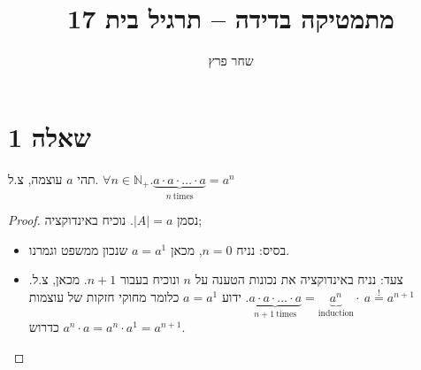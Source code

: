 \documentclass[]{article}
\title{מתמטיקה בדידה – תרגיל בית 17}
\author{שחר פרץ}
\newcommand\N     {\mathbb{N}}
\newcommand\seq   {\overset{!}{=}}
\begin{document}
	\maketitle
	\section*{שאלה 1}
	תהי $ a $ עוצמה, צ.ל.
	$ \forall n \in \N_+. \underbrace{a \cdot a \cdot \dotsc \cdot a}_{n \ \mathrm{times}} = a^n $
	\begin{proof}
		נסמן $ |A| = a $. נוכיח באינדוקציה;
		\begin{itemize}
			\item בסיס: נניח $ n = 0 $, מכאן $ a = a^1 $ שנכון ממשפט וגמרנו. 
			\item צעד: נניח באינדוקציה את נכונות הטענה על $ n $ ונוכיח בעבור $ n + 1 $. מכאן, צ.ל. $ \underbrace{a \cdot a \cdot \dotsc \cdot a}_{n + 1 \ \mathrm{times}} = \underbrace{a^n}_{\mathrm{induction}} \cdot \ a \seq a^{n + 1} $. ידוע $ a = a^1 $ כלומר מחוקי חזקות של עוצמות $ a^n \cdot a = a^n \cdot a^1 = a^{n + 1} $ כדרוש. 
		\end{itemize}
	\end{proof}
\end{document}
